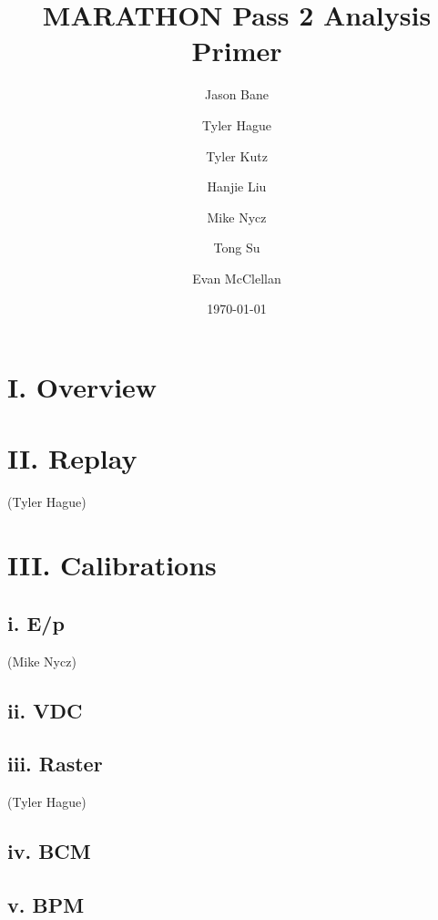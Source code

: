 \documentclass[letterpaper,aps,prl,superscriptaddress,floatfix,twocolumn]{revtex4}
\begin{document}
\title{MARATHON Pass 2 Analysis Primer}

\author{Jason Bane}
\author{Tyler Hague}
\author{Tyler Kutz}
\author{Hanjie Liu}
\author{Mike Nycz}
\author{Tong Su}

\author{Evan McClellan}


\date{\today}

\begin{abstract}
\end{abstract}

\maketitle

\section{I. Overview}

\section{II. Replay}
 (Tyler Hague)

\section{III. Calibrations}

 \subsection{i. E/p}
 (Mike Nycz)

 \subsection{ii. VDC}

 \subsection{iii. Raster}
 (Tyler Hague)

 \subsection{iv. BCM}


 \subsection{v. BPM}

 
\end{document}
